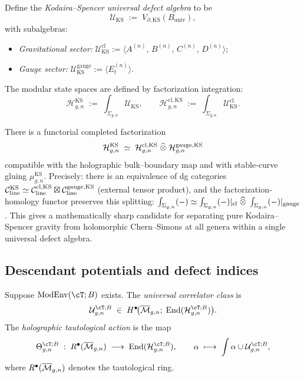\begin{definition}
Define the \emph{Kodaira--Spencer universal defect algebra} to be
\[
\mathcal{U}_{\mathrm{KS}}
\;:=\;
V_{\partial,\mathrm{KS}}(B_{\mathrm{univ}}),
\]
with subalgebras:
\begin{itemize}[leftmargin=1.8em]
\item \emph{Gravitational sector:}
 $\mathcal{U}_{\mathrm{KS}}^{\mathrm{cl}}
 :=\langle A^{(n)},\,B^{(n)},\,C^{(n)},\,D^{(n)}\rangle$;
\item \emph{Gauge sector:}
 $\mathcal{U}_{\mathrm{KS}}^{\mathrm{gauge}}
 :=\langle E_t^{(n)}\rangle$.
\end{itemize}
The modular state spaces are defined by factorization integration:
\[
\mathcal{H}_{g,n}^{\mathrm{KS}}
\;:=\;
\int_{\Sigma_{g,n}}\!\mathcal{U}_{\mathrm{KS}},
\qquad
\mathcal{H}_{g,n}^{\mathrm{cl,KS}}
\;:=\;
\int_{\Sigma_{g,n}}\!\mathcal{U}_{\mathrm{KS}}^{\mathrm{cl}}.
\]
\end{definition}

\begin{conjecture}
There is a functorial completed factorization
\[
\mathcal{H}_{g,n}^{\mathrm{KS}}
\;\simeq\;
\mathcal{H}_{g,n}^{\mathrm{cl,KS}}
\;\widehat{\otimes}\;
\mathcal{H}_{g,n}^{\mathrm{gauge,KS}}
\]
compatible with the holographic bulk--boundary map and with stable-curve
gluing
$\mu_{g,n}^{\mathrm{KS}}$.
Precisely: there is an equivalence of dg categories
$\mathcal C_{\mathrm{line}}^{\mathrm{KS}} \simeq
\mathcal C_{\mathrm{line}}^{\mathrm{cl,KS}} \boxtimes
\mathcal C_{\mathrm{line}}^{\mathrm{gauge,KS}}$
(external tensor product), and the factorization-homology functor preserves
this splitting:
$\int_{\Sigma_{g,n}} (-) \simeq
\int_{\Sigma_{g,n}} (-)|_{\mathrm{cl}} \;\widehat{\otimes}\;
\int_{\Sigma_{g,n}} (-)|_{\mathrm{gauge}}$.
This gives a mathematically sharp candidate for separating pure
Kodaira--Spencer gravity from holomorphic Chern--Simons at all genera
within a single universal defect algebra.
\end{conjecture}


\subsection{Descendant potentials and defect indices}

\begin{definition}
Suppose $\ModEnv(\cT;B)$ exists. The \emph{universal correlator class} is
\[
\mathcal{U}_{g,n}^{\cT;B}
\;\in\;
H^{\bullet}\!\bigl(\Mbar_{g,n};\;\End(\mathcal{H}_{g,n}^{\cT;B})\bigr).
\]
The \emph{holographic tautological action} is the map
\[
\Theta_{g,n}^{\cT;B}
\;:\;
\Rring(\Mbar_{g,n})
\;\longrightarrow\;
\End(\mathcal{H}_{g,n}^{\cT;B}),
\qquad
\alpha\;\longmapsto\;
\int\alpha\cup\mathcal{U}_{g,n}^{\cT;B},
\]
where $R^{\bullet}(\overline{\mathcal M}_{g,n})$ denotes the tautological ring.
\end{definition}

